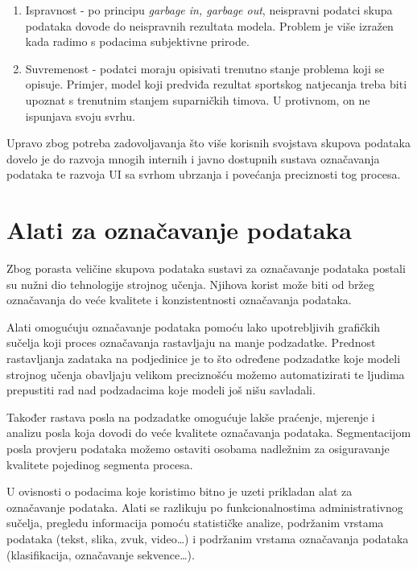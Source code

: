 \documentclass[times, utf8, zavrsni, numeric]{fer}
\begin{document}
\begin{enumerate}
    \item Ispravnost - po principu \glqq\textit{garbage in, garbage out}\grqq, neispravni podatci skupa podataka dovode do neispravnih rezultata modela. Problem je više izražen kada radimo s podacima subjektivne prirode. \citep{baliga1997learning}
    \item Suvremenost - podatci moraju opisivati trenutno stanje problema koji se opisuje. Primjer, model koji predviđa rezultat sportskog natjecanja treba biti upoznat s trenutnim stanjem suparničkih timova. U protivnom, on ne ispunjava svoju svrhu. \citep{karatas2020increasing}
\end{enumerate}

Upravo zbog potreba zadovoljavanja što više korisnih svojstava skupova podataka dovelo je do razvoja mnogih internih i javno dostupnih sustava označavanja podataka te razvoja UI sa svrhom ubrzanja i povećanja preciznosti tog procesa. \citep{cognilytica2019}

\section{Alati za označavanje podataka}

Zbog porasta veličine skupova podataka sustavi za označavanje podataka postali su nužni dio tehnologije strojnog učenja. Njihova korist može biti od bržeg označavanja do veće kvalitete i konzistentnosti označavanja podataka.

Alati omogućuju označavanje podataka pomoću lako upotrebljivih grafičkih sučelja koji proces označavanja rastavljaju na manje podzadatke. Prednost rastavljanja zadataka na podjedinice je to što određene podzadatke koje modeli strojnog učenja obavljaju velikom preciznošću možemo automatizirati te ljudima prepustiti rad nad podzadacima koje modeli još nišu savladali.

Također rastava posla na podzadatke omogućuje lakše praćenje, mjerenje i analizu posla koja dovodi do veće kvalitete označavanja podataka. Segmentacijom posla provjeru podataka možemo ostaviti osobama nadležnim za osiguravanje kvalitete pojedinog segmenta procesa.

U ovisnosti o podacima koje koristimo bitno je uzeti prikladan alat za označavanje podataka. Alati se razlikuju po funkcionalnostima administrativnog sučelja, pregledu informacija pomoću statističke analize, podržanim vrstama podataka (tekst, slika, zvuk, video\dots) i podržanim vrstama označavanja podataka (klasifikacija, označavanje sekvence\dots).
\end{document}
